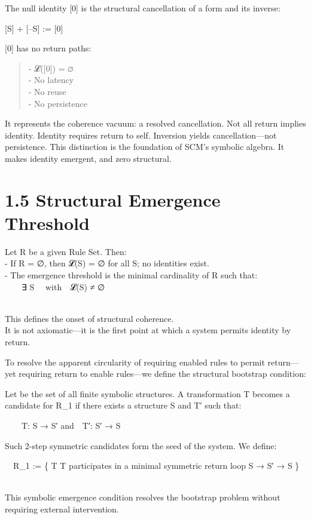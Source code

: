 The null identity {[}0{]} is the structural cancellation of a form and
its inverse:

{[}S{]} + {[}--S{]} := {[}0{]}

{[}0{]} has no return paths:

\begin{quote}
- 𝓛({[}0{]}) = ∅\\
- No latency\\
- No reuse\\
- No persistence
\end{quote}

It represents the coherence vacuum: a resolved cancellation. Not all
return implies identity. Identity requires return to self. Inversion
yields cancellation---not persistence. This distinction is the
foundation of SCM's symbolic algebra. It makes identity emergent, and
zero structural.

\section{1.5 \textbar{} Structural Emergence
Threshold}\label{structural-emergence-threshold}

Let R be a given Rule Set. Then:\\
- If R = ∅, then 𝓛(S) = ∅ for all S; no identities exist.\\
- The emergence threshold is the minimal cardinality of R such that:\\
  ∃ S \in \Sigma* with 𝓛(S) ≠ ∅\\
\strut \\
This defines the onset of structural coherence.\\
It is not axiomatic---it is the first point at which a system permits
identity by return.

To resolve the apparent circularity of requiring enabled rules to permit
return---yet requiring return to enable rules---we define the structural
bootstrap condition:

Let \Sigma* be the set of all finite symbolic structures. A transformation T
\in \Sigma* becomes a candidate for R_1 if there exists a structure S \in \Sigma* and
T′ \in \Sigma* such that:

  T: S → S′ and T′: S′ → S

Such 2-step symmetric candidates form the seed of the system. We define:

 R_1 := \{ T \in \Sigma* \textbar{} T participates in a minimal symmetric return
loop S → S′ → S \}\\
\strut \\
This symbolic emergence condition resolves the bootstrap problem without
requiring external intervention.

